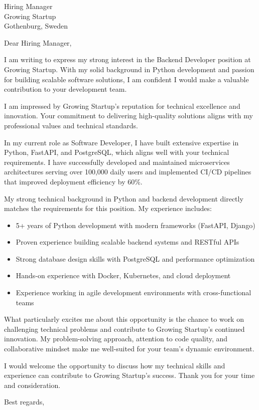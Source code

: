 \documentclass[11pt,a4paper]{letter}
\begin{document}
\begin{letter}{Hiring Manager \\ Growing Startup \\ Gothenburg, Sweden}

\opening{Dear Hiring Manager,}

I am writing to express my strong interest in the Backend Developer position at Growing Startup. With my solid background in Python development and passion for building scalable software solutions, I am confident I would make a valuable contribution to your development team.

I am impressed by Growing Startup's reputation for technical excellence and innovation. Your commitment to delivering high-quality solutions aligns with my professional values and technical standards.

In my current role as Software Developer, I have built extensive expertise in Python, FastAPI, and PostgreSQL, which aligns well with your technical requirements. I have successfully developed and maintained microservices architectures serving over 100,000 daily users and implemented CI/CD pipelines that improved deployment efficiency by 60\%.

My strong technical background in Python and backend development directly matches the requirements for this position. My experience includes:

\begin{itemize}
\item 5+ years of Python development with modern frameworks (FastAPI, Django)
\item Proven experience building scalable backend systems and RESTful APIs
\item Strong database design skills with PostgreSQL and performance optimization
\item Hands-on experience with Docker, Kubernetes, and cloud deployment
\item Experience working in agile development environments with cross-functional teams
\end{itemize}

What particularly excites me about this opportunity is the chance to work on challenging technical problems and contribute to Growing Startup's continued innovation. My problem-solving approach, attention to code quality, and collaborative mindset make me well-suited for your team's dynamic environment.

I would welcome the opportunity to discuss how my technical skills and experience can contribute to Growing Startup's success. Thank you for your time and consideration.

\closing{Best regards,}

\end{letter}
\end{document}
